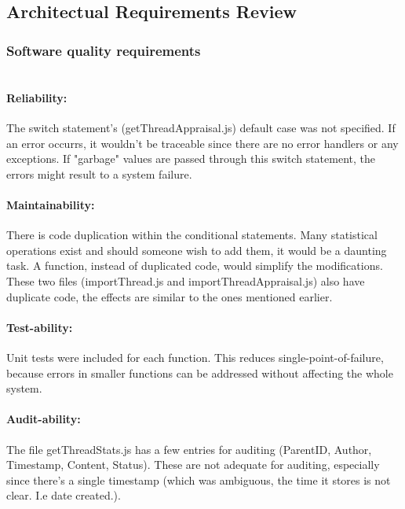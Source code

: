 \subsection{Architectual Requirements Review}

\subsubsection{Software quality requirements} 

\paragraph{\\Reliability:}
The switch statement's (getThreadAppraisal.js) default case was not specified. If an error occurrs, it wouldn't be traceable since there are no error handlers or any exceptions. If "garbage" values are passed through this switch statement, the errors might result to a system failure.
\par
\paragraph{Maintainability:}
There is code duplication within the conditional statements. Many statistical operations exist and should someone wish to add them, it would be a daunting task. A function, instead of duplicated code, would simplify the modifications. \\
These two files (importThread.js and importThreadAppraisal.js) also have duplicate code, the effects are similar to the ones mentioned earlier.
\par
\paragraph{Test-ability:}
Unit tests were included for each function. This reduces single-point-of-failure, because errors in smaller functions can be addressed without affecting the whole system.
\par
\paragraph {Audit-ability:}
The file getThreadStats.js has a few entries for auditing (ParentID, Author, Timestamp, Content, Status). These are not adequate for auditing, especially since there's a single timestamp (which was ambiguous, the time it stores is not clear. I.e date created.). \\
\par


